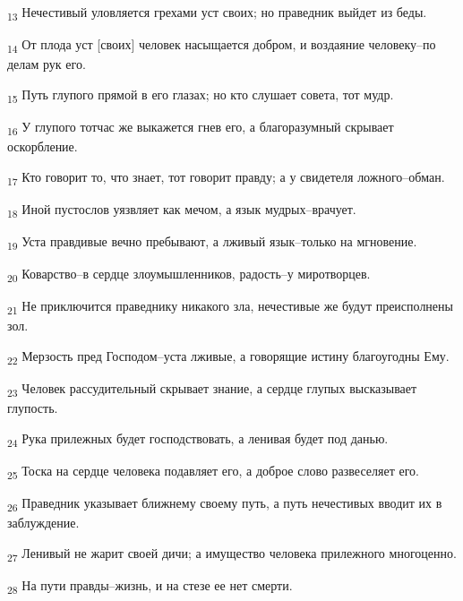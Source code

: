 \begin{tcolorbox}
\textsubscript{13} Нечестивый уловляется грехами уст своих; но праведник выйдет из беды.
\end{tcolorbox}
\begin{tcolorbox}
\textsubscript{14} От плода уст [своих] человек насыщается добром, и воздаяние человеку--по делам рук его.
\end{tcolorbox}
\begin{tcolorbox}
\textsubscript{15} Путь глупого прямой в его глазах; но кто слушает совета, тот мудр.
\end{tcolorbox}
\begin{tcolorbox}
\textsubscript{16} У глупого тотчас же выкажется гнев его, а благоразумный скрывает оскорбление.
\end{tcolorbox}
\begin{tcolorbox}
\textsubscript{17} Кто говорит то, что знает, тот говорит правду; а у свидетеля ложного--обман.
\end{tcolorbox}
\begin{tcolorbox}
\textsubscript{18} Иной пустослов уязвляет как мечом, а язык мудрых--врачует.
\end{tcolorbox}
\begin{tcolorbox}
\textsubscript{19} Уста правдивые вечно пребывают, а лживый язык--только на мгновение.
\end{tcolorbox}
\begin{tcolorbox}
\textsubscript{20} Коварство--в сердце злоумышленников, радость--у миротворцев.
\end{tcolorbox}
\begin{tcolorbox}
\textsubscript{21} Не приключится праведнику никакого зла, нечестивые же будут преисполнены зол.
\end{tcolorbox}
\begin{tcolorbox}
\textsubscript{22} Мерзость пред Господом--уста лживые, а говорящие истину благоугодны Ему.
\end{tcolorbox}
\begin{tcolorbox}
\textsubscript{23} Человек рассудительный скрывает знание, а сердце глупых высказывает глупость.
\end{tcolorbox}
\begin{tcolorbox}
\textsubscript{24} Рука прилежных будет господствовать, а ленивая будет под данью.
\end{tcolorbox}
\begin{tcolorbox}
\textsubscript{25} Тоска на сердце человека подавляет его, а доброе слово развеселяет его.
\end{tcolorbox}
\begin{tcolorbox}
\textsubscript{26} Праведник указывает ближнему своему путь, а путь нечестивых вводит их в заблуждение.
\end{tcolorbox}
\begin{tcolorbox}
\textsubscript{27} Ленивый не жарит своей дичи; а имущество человека прилежного многоценно.
\end{tcolorbox}
\begin{tcolorbox}
\textsubscript{28} На пути правды--жизнь, и на стезе ее нет смерти.
\end{tcolorbox}
